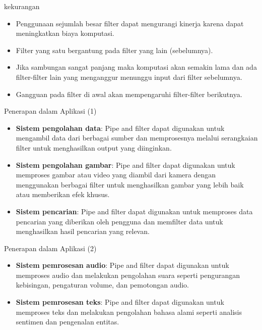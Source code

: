 \documentclass[aspectratio=169, table]{beamer}
\begin{document}
    \begin{frame}{kekurangan}
        \begin{itemize}
            \item 	Penggunaan sejumlah besar filter dapat mengurangi kinerja karena dapat meningkatkan biaya komputasi.
            \item Filter yang satu bergantung pada filter yang lain (sebelumnya).
            \item Jika sambungan sangat panjang maka komputasi akan semakin lama dan ada filter-filter lain yang menganggur menunggu input dari filter sebelumnya.
            \item Gangguan pada filter di awal akan mempengaruhi filter-filter berikutnya.
        \end{itemize}

    \end{frame}
    \begin{frame}{Penerapan dalam Aplikasi (1)}
        \begin{itemize}
            \item \textbf{Sistem pengolahan data}: Pipe and filter dapat digunakan untuk mengambil data dari berbagai sumber dan memprosesnya melalui serangkaian filter untuk menghasilkan output yang diinginkan.

            \item \textbf{Sistem pengolahan gambar}: Pipe and filter dapat digunakan untuk memproses gambar atau video yang diambil dari kamera dengan menggunakan berbagai filter untuk menghasilkan gambar yang lebih baik atau memberikan efek khusus.

            \item \textbf{Sistem pencarian}: Pipe and filter dapat digunakan untuk memproses data pencarian yang diberikan oleh pengguna dan memfilter data untuk menghasilkan hasil pencarian yang relevan.

        \end{itemize}
    \end{frame}

    \begin{frame}{Penerapan dalam Aplikasi (2)}
        \begin{itemize}
            \item \textbf{Sistem pemrosesan audio}: Pipe and filter dapat digunakan untuk memproses audio dan melakukan pengolahan suara seperti pengurangan kebisingan, pengaturan volume, dan pemotongan audio.

            \item \textbf{Sistem pemrosesan teks}: Pipe and filter dapat digunakan untuk memproses teks dan melakukan pengolahan bahasa alami seperti analisis sentimen dan pengenalan entitas.
        \end{itemize}
    \end{frame}
\end{document}
